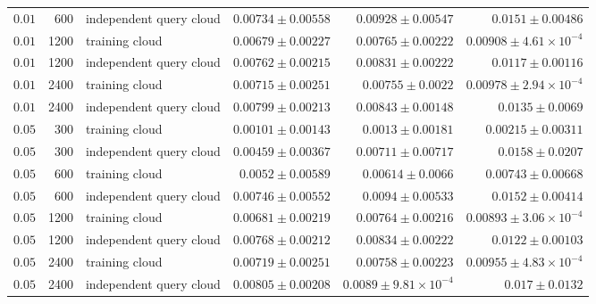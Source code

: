 \begin{longtable}{r r L{0.25\textwidth} r r r}
$0.01$ & 600 & independent query cloud & $0.00734\pm 0.00558$ & $0.00928\pm 0.00547$ & $0.0151\pm 0.00486$ \\
$0.01$ & 1200 & training cloud & $0.00679\pm 0.00227$ & $0.00765\pm 0.00222$ & $0.00908\pm 4.61\times10^{-4}$ \\
$0.01$ & 1200 & independent query cloud & $0.00762\pm 0.00215$ & $0.00831\pm 0.00222$ & $0.0117\pm 0.00116$ \\
$0.01$ & 2400 & training cloud & $0.00715\pm 0.00251$ & $0.00755\pm 0.0022$ & $0.00978\pm 2.94\times10^{-4}$ \\
$0.01$ & 2400 & independent query cloud & $0.00799\pm 0.00213$ & $0.00843\pm 0.00148$ & $0.0135\pm 0.0069$ \\
$0.05$ & 300 & training cloud & $0.00101\pm 0.00143$ & $0.0013\pm 0.00181$ & $0.00215\pm 0.00311$ \\
$0.05$ & 300 & independent query cloud & $0.00459\pm 0.00367$ & $0.00711\pm 0.00717$ & $0.0158\pm 0.0207$ \\
$0.05$ & 600 & training cloud & $0.0052\pm 0.00589$ & $0.00614\pm 0.0066$ & $0.00743\pm 0.00668$ \\
$0.05$ & 600 & independent query cloud & $0.00746\pm 0.00552$ & $0.0094\pm 0.00533$ & $0.0152\pm 0.00414$ \\
$0.05$ & 1200 & training cloud & $0.00681\pm 0.00219$ & $0.00764\pm 0.00216$ & $0.00893\pm 3.06\times10^{-4}$ \\
$0.05$ & 1200 & independent query cloud & $0.00768\pm 0.00212$ & $0.00834\pm 0.00222$ & $0.0122\pm 0.00103$ \\
$0.05$ & 2400 & training cloud & $0.00719\pm 0.00251$ & $0.00758\pm 0.00223$ & $0.00955\pm 4.83\times10^{-4}$ \\
$0.05$ & 2400 & independent query cloud & $0.00805\pm 0.00208$ & $0.0089\pm 9.81\times10^{-4}$ & $0.017\pm 0.0132$ \\
\end{longtable}
\endgroup

